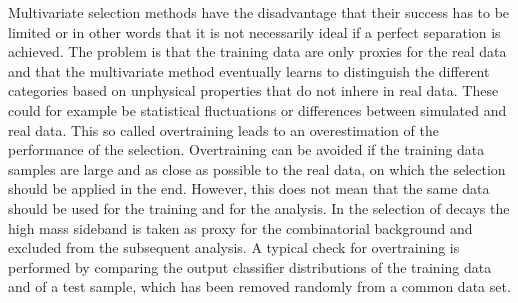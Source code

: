 Multivariate selection methods have the disadvantage that their success has to
be limited or in other words that it is not necessarily ideal if a perfect
separation is achieved. The problem is that the training data are only proxies
for the real data and that the multivariate method eventually learns to
distinguish the different categories based on unphysical properties that do
not inhere in real data. These could for example be statistical fluctuations
or differences between simulated and real data. This so called overtraining
leads to an overestimation of the performance of the selection. Overtraining
can be avoided if the training data samples are large and as close as possible
to the real data, on which the selection should be applied in the end.
However, this does not mean that the same data should be used for the training
and for the analysis. In the selection of \BdToDD decays the high mass
sideband is taken as proxy for the combinatorial background and excluded from
the subsequent analysis. A typical check for overtraining is performed by
comparing the output classifier distributions of the training data and of a
test sample, which has been removed randomly from a common data set.